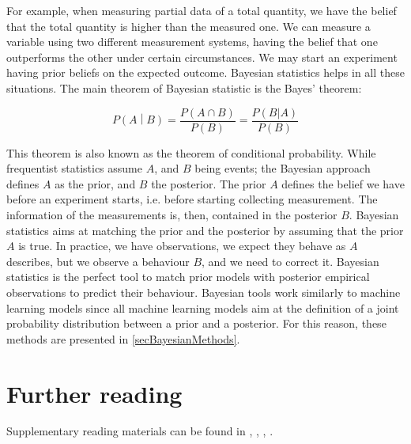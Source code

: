 For example, when measuring partial data of a total quantity, we have the belief that the total quantity is higher than the measured one. We can measure a variable using two different measurement systems, having the belief that one outperforms the other under certain circumstances. We may start an experiment having prior beliefs on the expected outcome. Bayesian statistics helps in all these situations. The main theorem of Bayesian statistic is the Bayes’ theorem:

\begin{equation}
P\left(A\middle| B\right)=\frac{P(A\cap B)}{P(B)}=\frac{P(B|A)}{P(B)}
\label{eq_bayesTheorem}
\end{equation}

This theorem is also known as the theorem of conditional probability. While frequentist statistics assume $A$, and $B$ being events; the Bayesian approach defines $A$ as the prior, and $B$ the posterior. The prior $A$ defines the belief we have before an experiment starts, i.e. before starting collecting measurement. The information of the measurements is, then, contained in the posterior $B$. Bayesian statistics aims at matching the prior and the posterior by assuming that the prior $A$ is true. In practice, we have observations, we expect they behave as $A$ describes, but we observe a behaviour $B$, and we need to correct it. Bayesian statistics is the perfect tool to match prior models with posterior empirical observations to predict their behaviour. Bayesian tools work similarly to machine learning models since all machine learning models aim at the definition of a joint probability distribution between a prior and a posterior. For this reason, these methods are presented in \ref{secBayesianMethods}.



\section*{Further reading}
Supplementary reading materials can be found in \cite{Sauter2002}, \cite{Ruppert2015}, \cite{Brandt2014}, \cite{Heibergerer2015}.





